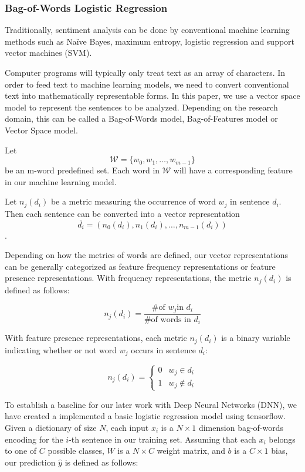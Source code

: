\documentclass[conference]{IEEEtran}
\begin{document}
\subsubsection{Bag-of-Words Logistic Regression}
\label{model:core:bow}
    Traditionally, sentiment analysis can be done by conventional machine learning
    methods such as Na\"ive Bayes, maximum entropy, logistic regression and 
    support vector machines (SVM). 
    
    Computer programs will typically only treat text as an array of characters.
    In order to feed text to machine learning models, we need to 
    convert conventional text into mathematically representable forms. In this
    paper, we use a vector space model to represent the sentences to be analyzed.
    Depending on the research domain, this can be called a Bag-of-Words model, 
    Bag-of-Features model or Vector Space model\cite{salton1975vector}.
    
    Let $$\mathcal{W}=\{w_0, w_1,\ldots, w_{m-1}\}$$ be an m-word predefined set. Each 
    word in $\mathcal{W}$ will have a corresponding feature in our machine learning model.
    
    Let $n_j(d_i)$ be a metric measuring the occurrence of word $w_j$
    in sentence $d_i$. Then each sentence can be converted into a vector representation 
    $$\bar{d_i}=(n_0(d_i),n_1(d_i),\ldots,n_{m-1}(d_i))$$.
    
    Depending on how the metrics of words are defined, our vector representations can be
    generally categorized as feature frequency representations or feature presence
    representations\cite{pang2002thumbs}. With frequency representations, the metric 
    $n_j(d_i)$ is defined as follows: 
     
    $$n_j(d_i) = \frac{\text{\# of }w_j \text{in } d_i}{\text{\# of words in } d_i}$$

    With feature presence representations, each metric $n_j(d_i)$ is a binary
    variable indicating whether or not word $w_j$ occurs in sentence $d_i$:
     
    $$n_j(d_i) = \begin{cases} 
        0 & w_j \in d_i\\
        1 & w_j \notin d_i
    \end{cases}$$
    
    To establish a baseline for our later work with Deep Neural Networks (DNN), we have
    created a implemented a basic logistic regression model using tensorflow. Given a 
    dictionary of size $N$, each input $x_i$ is a $N \times 1$ dimension bag-of-words encoding
    for the $i$-th sentence in our training set. Assuming that each $x_i$ belongs to one of $C$
    possible classes, $W$ is a $N \times C$ weight matrix, and $b$ is a $C \times 1$ bias,
    our prediction $\hat{y}$ is defined as follows:
        
\end{document}
